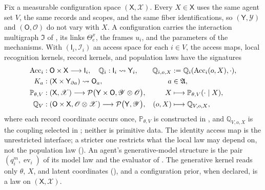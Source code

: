 Fix a measurable configuration space $(\mathsf X,\mathscr X)$. Every $X\in\mathsf X$ uses the same agent
set $V$, the same records and scopes, and the same fiber identifications, so $(\mathsf Y,\mathscr Y)$ and
$(\mathsf O,\mathscr O)$ do not vary with $X$. A configuration carries the interaction multigraph
$\mathfrak I$ of , its links $\Theta_e^x$, the frames $u_i$, and the parameters
of the mechanisms. With $(\mathsf I_i,\mathscr I_i)$ an access space for each $i\in V$, the access maps,
local recognition kernels, record kernels, and population laws have the signatures
\begin{align}
\operatorname{Acc}_i&:\mathsf O\times\mathsf X\longrightarrow\mathsf I_i,
\quad\mathbb Q_i:\mathsf I_i\rightsquigarrow\mathsf Y_i,
&\mathbb Q_{i,o,X}&:=\mathbb Q_i(\operatorname{Acc}_i(o,X),\cdot),
\label{eq:prob-local-recognition-kernel}\\
K_a&:(\mathsf X\times\mathsf Y_{\partial a})\rightsquigarrow\mathsf O_a,
&a&\in\mathfrak A,
\label{eq:prob-record-kernel-signature}\\
\mathbb P_{\theta,V}&:(\mathsf X,\mathscr X)\longrightarrow\mathcal P\bigl(\mathsf Y\times\mathsf O,\mathscr Y\otimes\mathscr O\bigr),
&X&\longmapsto\mathbb P_{\theta,V}(\cdot\mid X),
\label{eq:prob-generative-signature}\\
\mathbb Q_V&:(\mathsf O\times\mathsf X,\mathscr O\otimes\mathscr X)\longrightarrow\mathcal P\bigl(\mathsf Y,\mathscr Y\bigr),
&(o,X)&\longmapsto\mathbb Q_{V,o,X},
\label{eq:prob-recognition-signature}
\end{align}
where each record coordinate occurs once, $\mathbb P_{\theta,V}$ is constructed in , and
$\mathbb Q_{V,o,X}$ is the coupling selected in ; neither is primitive data. The
identity access map is the unrestricted interface; a stricter one restricts what the local law may depend
on, not the population law (). An agent's generative-model structure is
the pair $(q_i^m,\operatorname{ev}_i)$ of its model law and the evaluator of .
The generative kernel reads only $\theta$, $X$, and latent coordinates (),
and a configuration prior, when declared, is a law on $(\mathsf X,\mathscr X)$.

